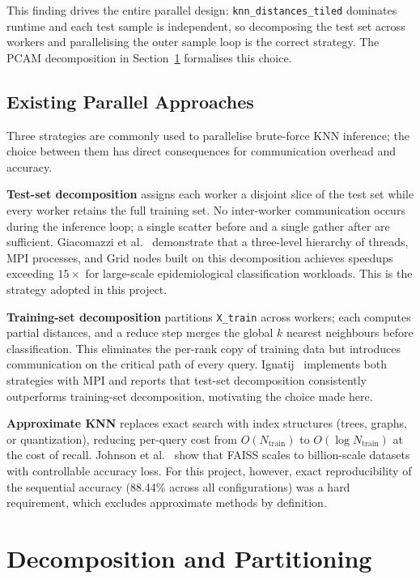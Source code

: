 \documentclass[12pt,a4paper]{article}
\begin{document}
This finding drives the entire parallel design: \texttt{knn\_distances\_tiled}
dominates runtime and each test sample is independent, so decomposing the
test set across workers and parallelising the outer sample loop is the
correct strategy. The PCAM decomposition in
Section~\ref{sec:decomposition} formalises this choice.

\subsection{Existing Parallel Approaches}

Three strategies are commonly used to parallelise brute-force KNN inference;
the choice between them has direct consequences for communication overhead
and accuracy.

\textbf{Test-set decomposition} assigns each worker a disjoint slice of the
test set while every worker retains the full training set. No inter-worker
communication occurs during the inference loop; a single scatter before and
a single gather after are sufficient. Giacomazzi et al.~\cite{giacomazzi2006}
demonstrate that a three-level hierarchy of threads, MPI processes, and Grid
nodes built on this decomposition achieves speedups exceeding $15\times$ for
large-scale epidemiological classification workloads. This is the strategy
adopted in this project.

\textbf{Training-set decomposition} partitions \texttt{X\_train} across
workers; each computes partial distances, and a reduce step merges the global
$k$ nearest neighbours before classification. This eliminates the per-rank
copy of training data but introduces communication on the critical path of
every query. Ignatij~\cite{ignatij2022} implements both strategies with MPI
and reports that test-set decomposition consistently outperforms training-set
decomposition, motivating the choice made here.

\textbf{Approximate KNN} replaces exact search with index structures
(trees, graphs, or quantization), reducing per-query cost from
$O(N_\text{train})$ to $O(\log N_\text{train})$ at the cost of recall.
Johnson et al.~\cite{johnson2017faiss} show that FAISS scales to
billion-scale datasets with controllable accuracy loss. For this project,
however, exact reproducibility of the sequential accuracy (88.44\% across
all configurations) was a hard requirement, which excludes approximate
methods by definition.

\section{Decomposition and Partitioning}
\label{sec:decomposition}
\end{document}

